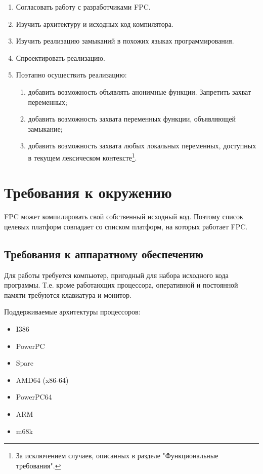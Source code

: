 \documentclass{imcs}
\begin{document}
\begin{enumerate}
    \item Согласовать работу с разработчиками FPC.
    \item Изучить архитектуру и исходных код компилятора.
    \item Изучить реализацию замыканий в похожих языках программирования.
    \item Спроектировать реализацию.
    \item Поэтапно осуществить реализацию:
      \begin{enumerate}
          \item добавить возможность объявлять анонимные функции. Запретить захват переменных;
          \item добавить возможность захвата переменных функции, объявляющей замыкание;
          \item добавить возможность захвата любых локальных переменных, 
                доступных в текущем лексическом контексте\footnote{За исключением случаев, описанных в разделе "Функциональные требования".}.
      \end{enumerate}        
\end{enumerate}

\section{Требования к окружению}

FPC может компилировать свой собственный исходный код. Поэтому
список целевых платформ совпадает со списком платформ, на которых работает
FPC.

\subsection{Требования к аппаратному обеспечению}

Для работы требуется компьютер, пригодный для набора исходного кода программы.
Т.е. кроме работающих процессора, оперативной и постоянной памяти требуются
клавиатура и монитор.

Поддерживаемые архитектуры процессоров\cite{fpctargets}:
\begin{itemize}
    \item I386
    \item PowerPC
    \item Sparc
    \item AMD64 (x86-64)
    \item PowerPC64
    \item ARM
    \item m68k 
\end{itemize}
\end{document}

